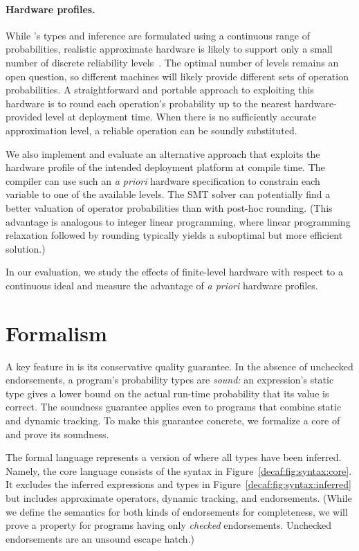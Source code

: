 {\paragraph{Hardware profiles.}

While \lang's types and inference are formulated using a continuous range of
probabilities, realistic approximate hardware is likely to support only a
small number of discrete reliability levels~\cite{truffle, quora}.
The optimal number of levels remains an open question, so different machines
will likely provide different sets of operation probabilities.
A straightforward and portable approach to exploiting this hardware is to
round each operation's probability up to the nearest hardware-provided level
at deployment time.
When there is no sufficiently accurate approximation level, a reliable
operation can be soundly substituted.

We also implement and evaluate an alternative approach that exploits the
hardware profile of the intended deployment platform at compile time.
The compiler can use such an \emph{a priori} hardware specification to
constrain each variable to one of the available levels.
The SMT solver can potentially find a better valuation of operator
probabilities than with post-hoc rounding.
(This advantage is analogous to integer linear programming, where linear
programming relaxation followed by rounding typically yields a suboptimal but
more efficient solution.)

In our evaluation, we study the effects of finite-level hardware with respect
to a continuous ideal and measure the advantage of \emph{a priori} hardware
profiles.


\section{Formalism}
\label{decaf:sec:semantics}

A key feature in \lang is its conservative quality guarantee.
In the absence of unchecked endorsements, a \lang program's probability types
are \emph{sound:} an expression's static type gives a lower bound on the actual
run-time probability that its value is correct.
The soundness guarantee applies
even to programs that combine static and dynamic tracking.
To make this guarantee concrete, we formalize a core of \lang and prove its
soundness.

The formal language represents a version of \lang where all types have been
inferred.
Namely, the core language consists of the syntax in
Figure~\ref{decaf:fig:syntax:core}.
It excludes the inferred expressions and types in
Figure~\ref{decaf:fig:syntax:inferred} but
includes approximate operators, dynamic tracking, and endorsements.
(While we define the semantics for both kinds of endorsements for
completeness, we will prove a property for programs having only \emph{checked}
endorsements. Unchecked endorsements are an unsound escape hatch.)

}
